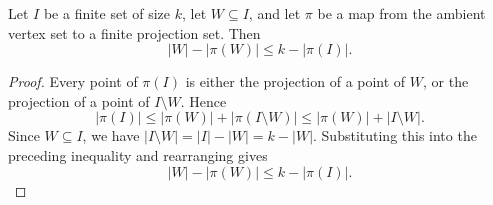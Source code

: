 \begin{helper}
Let \(I\) be a finite set of size \(k\), let \(W\subseteq I\), and let
\(\pi\) be a map from the ambient vertex set to a finite projection set.  Then
\[
|W|-|\pi(W)|\le k-|\pi(I)|.
\]
\end{helper}
\begin{proof}
Every point of \(\pi(I)\) is either the projection of a point of \(W\), or the
projection of a point of \(I\setminus W\).  Hence
\[
|\pi(I)|\le |\pi(W)|+|\pi(I\setminus W)|
  \le |\pi(W)|+|I\setminus W|.
\]
Since \(W\subseteq I\), we have \(|I\setminus W|=|I|-|W|=k-|W|\).  Substituting
this into the preceding inequality and rearranging gives
\[
|W|-|\pi(W)|\le k-|\pi(I)|.
\]
\end{proof}
